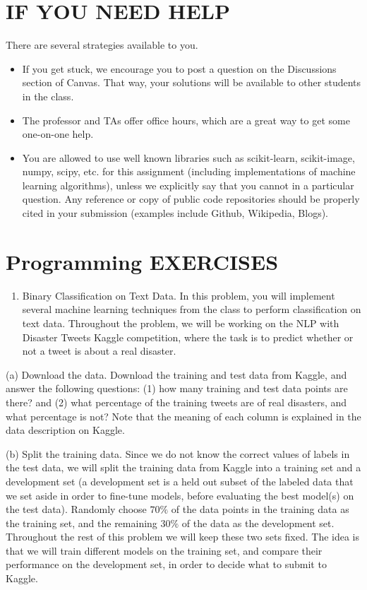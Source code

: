 \documentclass[10pt]{article}
\begin{document}
\section{IF YOU NEED HELP}
There are several strategies available to you.

\begin{itemize}
  \item If you get stuck, we encourage you to post a question on the Discussions section of Canvas. That way, your solutions will be available to other students in the class.

  \item The professor and TAs offer office hours, which are a great way to get some one-on-one help.

  \item You are allowed to use well known libraries such as scikit-learn, scikit-image, numpy, scipy, etc. for this assignment (including implementations of machine learning algorithms), unless we explicitly say that you cannot in a particular question. Any reference or copy of public code repositories should be properly cited in your submission (examples include Github, Wikipedia, Blogs).

\end{itemize}

\section{Programming EXERCISES}
\begin{enumerate}
  \item Binary Classification on Text Data. In this problem, you will implement several machine learning techniques from the class to perform classification on text data. Throughout the problem, we will be working on the NLP with Disaster Tweets Kaggle competition, where the task is to predict whether or not a tweet is about a real disaster.
\end{enumerate}

(a) Download the data. Download the training and test data from Kaggle, and answer the following questions: (1) how many training and test data points are there? and (2) what percentage of the training tweets are of real disasters, and what percentage is not? Note that the meaning of each column is explained in the data description on Kaggle.

(b) Split the training data. Since we do not know the correct values of labels in the test data, we will split the training data from Kaggle into a training set and a development set (a development set is a held out subset of the labeled data that we set aside in order to fine-tune models, before evaluating the best model(s) on the test data). Randomly choose $70 \%$ of the data points in the training data as the training set, and the remaining $30 \%$ of the data as the development set. Throughout the rest of this problem we will keep these two sets fixed. The idea is that we will train different models on the training set, and compare their performance on the development set, in order to decide what to submit to Kaggle.
\end{document}

